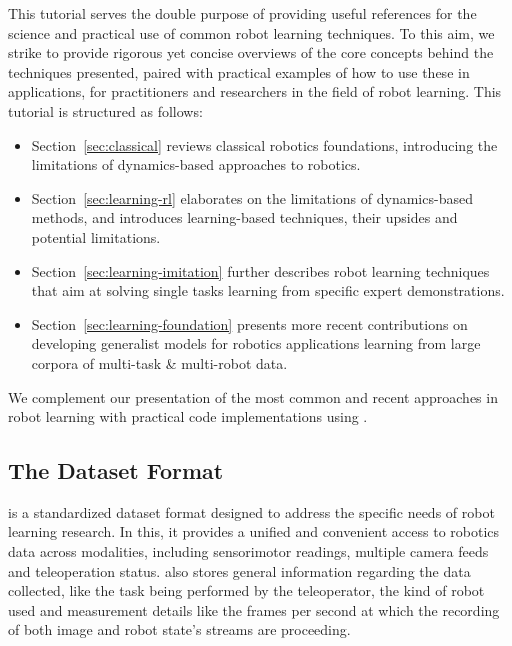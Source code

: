 This tutorial serves the double purpose of providing useful references for the science and practical use of common robot learning techniques.
To this aim, we strike to provide rigorous yet concise overviews of the core concepts behind the techniques presented, paired with practical examples of how to use these in applications, for practitioners and researchers in the field of robot learning.
This tutorial is structured as follows:
\begin{itemize}
\item Section~\ref{sec:classical} reviews classical robotics foundations, introducing the limitations of dynamics-based approaches to robotics.
\item Section~\ref{sec:learning-rl} elaborates on the limitations of dynamics-based methods, and introduces learning-based techniques, their upsides and potential limitations.
\item Section~\ref{sec:learning-imitation} further describes robot learning techniques that aim at solving single tasks learning from specific expert demonstrations.
\item Section~\ref{sec:learning-foundation} presents more recent contributions on developing generalist models for robotics applications learning from large corpora of multi-task \& multi-robot data.
\end{itemize}

We complement our presentation of the most common and recent approaches in robot learning with practical code implementations using \lerobot.

\subsection{The Dataset Format}

\lerobotdataset is a standardized dataset format designed to address the specific needs of robot learning research. 
In this, it provides a unified and convenient access to robotics data across modalities, including sensorimotor readings, multiple camera feeds and teleoperation status. 
\lerobotdataset also stores general information regarding the data collected, like the task being performed by the teleoperator, the kind of robot used and measurement details like the frames per second at which the recording of both image and robot state's streams are proceeding. 

